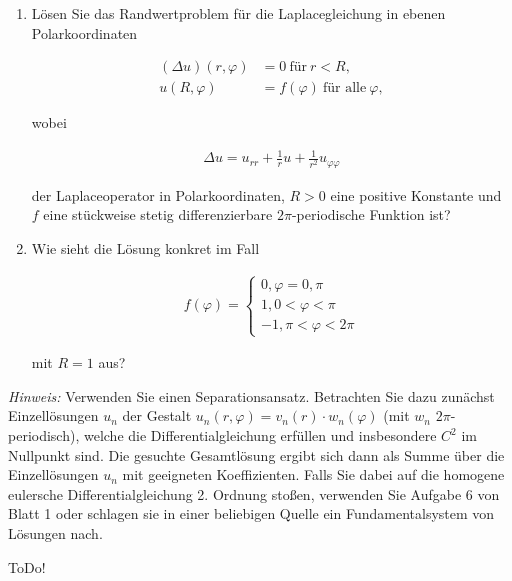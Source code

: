 
\begin{exercise}

\phantom{}

\begin{enumerate}[label = (\roman*)]

    \item Lösen Sie das Randwertproblem für die Laplacegleichung in ebenen Polarkoordinaten
    
    \begin{align*}
        (\Delta u)(r, \varphi)
        & =
        0 ~\text{für}~ r < R, \\
        u(R, \varphi)
        & =
        f(\varphi) ~\text{für alle}~ \varphi,
    \end{align*}

    wobei

    \begin{align*}
        \Delta u
        =
        u_{rr} + \frac{1}{r} u + \frac{1}{r^2} u_{\varphi \varphi}
    \end{align*}

    der Laplaceoperator in Polarkoordinaten, $R > 0$ eine positive Konstante und $f$ eine stückweise stetig differenzierbare $2 \pi$-periodische Funktion ist?

    \item Wie sieht die Lösung konkret im Fall
    
    \begin{align*}
        f(\varphi)
        =
        \begin{cases}
            0,  \varphi = 0, \pi \\
            1,  0 < \varphi < \pi \\
            -1, \pi < \varphi < 2 \pi
        \end{cases}
    \end{align*}

    mit $R = 1$ aus?

\end{enumerate}

\textit{Hinweis:}
Verwenden Sie einen Separationsansatz.
Betrachten Sie dazu zunächst Einzellösungen $u_n$ der Gestalt $u_n(r, \varphi) = v_n(r) \cdot w_n(\varphi)$ (mit $w_n$ $2 \pi$-periodisch), welche die Differentialgleichung erfüllen und insbesondere $C^2$ im Nullpunkt sind.
Die gesuchte Gesamtlösung ergibt sich dann als Summe über die Einzellösungen $u_n$ mit geeigneten Koeffizienten.
Falls Sie dabei auf die homogene eulersche Differentialgleichung 2. Ordnung stoßen, verwenden Sie Aufgabe 6 von Blatt 1 oder schlagen sie in einer beliebigen Quelle ein Fundamentalsystem von Lösungen nach.

\end{exercise}


\begin{solution}

ToDo!

\end{solution}

